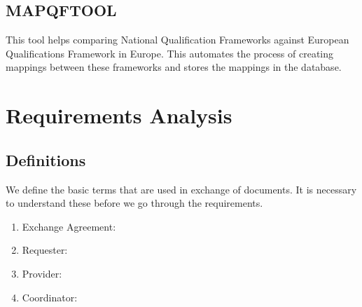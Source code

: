 \documentclass[12pt,a4paper,oneside]{book}
\begin{document}
\section{MAPQFTOOL}
This tool helps comparing National Qualification Frameworks against European Qualifications Framework in Europe. This automates the process of creating mappings between these frameworks and stores the mappings in the database.

\chapter{Requirements Analysis}\label{ch-requirements-analysis}
\section{Definitions}
We define the basic terms that are used in exchange of documents. It is necessary to understand these before we go through the requirements.

\begin{enumerate}
\item Exchange Agreement: 

\item Requester: 

\item Provider: 

\item Coordinator: 
	
\end{enumerate}
\end{document}
